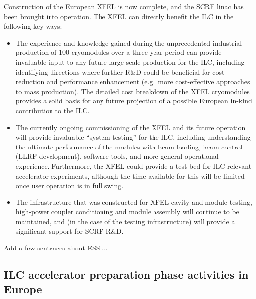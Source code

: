 \documentclass[%
 reprint,
 amsmath,amssymb,
 aps,
]{revtex4-1}
\begin{document}
Construction of the European XFEL is now complete, and the SCRF linac has been brought into operation. The XFEL can directly benefit the ILC in the following key ways:
\begin{itemize}
\item The experience and knowledge gained during the unprecedented industrial 
production of 100 cryomodules over a three-year period can provide 
invaluable input to any future large-scale production for the ILC, including 
identifying directions where further R\&D could be beneficial for cost reduction 
and performance enhancement (e.g.\ more cost-effective approaches to mass 
production). The detailed cost breakdown of the XFEL cryomodules provides a 
solid basis for any future projection of a possible European in-kind contribution 
to the ILC.
\item The currently ongoing commissioning of the XFEL and its future operation will 
provide invaluable ``system testing'' for the ILC, including understanding the 
ultimate performance of the modules with beam loading, beam control (LLRF 
development), software tools, and more general operational experience. 
Furthermore, the XFEL could provide a test-bed for ILC-relevant accelerator 
experiments, although the time available for this will be limited once user 
operation is in full swing.
\item The infrastructure that was constructed for XFEL cavity and module 
testing, high-power coupler conditioning and module assembly will continue to be 
maintained, and (in the case of the testing infrastructure) will provide a 
significant support for SCRF R\&D.
\end{itemize}

Add a few sentences about ESS ... 


\subsection{ILC accelerator preparation phase activities in Europe ~\label{sec:prepphase:accelerator}}
\end{document}
